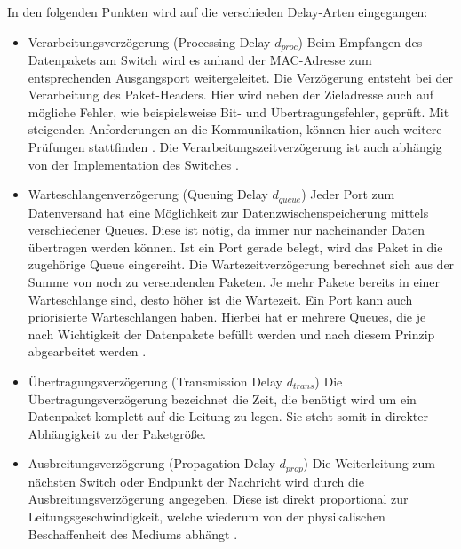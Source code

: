 In den folgenden Punkten wird auf die verschieden Delay-Arten eingegangen:
\begin{itemize}
	\item Verarbeitungsverzögerung (Processing Delay \emph{\(d_{proc}\)})
	\newline Beim Empfangen des Datenpakets am Switch wird es anhand der \ac{MAC}-Adresse zum entsprechenden Ausgangsport weitergeleitet. Die Verzögerung entsteht bei der Verarbeitung des Paket-Headers. Hier wird neben der Zieladresse auch auf mögliche Fehler, wie beispielsweise Bit- und Übertragungsfehler, geprüft. Mit steigenden Anforderungen an die Kommunikation, können hier auch weitere Prüfungen stattfinden \cite{CharacterizingNetwork}. Die Verarbeitungszeitverzögerung ist auch abhängig von der Implementation des Switches \cite{ComputerNetworking}.\newline
	\item Warteschlangenverzögerung (Queuing Delay \emph{\(d_{queue}\)})
	\newline Jeder Port zum Datenversand hat eine Möglichkeit zur Datenzwischenspeicherung mittels verschiedener Queues. Diese ist nötig, da immer nur nacheinander Daten übertragen werden können. Ist ein Port gerade belegt, wird das Paket in die zugehörige Queue eingereiht. Die Wartezeitverzögerung berechnet sich aus der Summe von noch zu versendenden Paketen. Je mehr Pakete bereits in einer Warteschlange sind, desto höher ist die Wartezeit.
	Ein Port kann auch priorisierte Warteschlangen haben. Hierbei hat er mehrere Queues, die je nach Wichtigkeit der Datenpakete befüllt werden und nach diesem Prinzip abgearbeitet werden \cite{ComputerNetworking}.\newline
	\item Übertragungsverzögerung (Transmission Delay \emph{\(d_{trans}\)})
	\newline Die Übertragungsverzögerung  bezeichnet die Zeit, die benötigt wird um ein Datenpaket komplett auf die Leitung zu legen. Sie steht somit in direkter Abhängigkeit zu der Paketgröße. \cite{ComputerNetworking}\newline
	\item Ausbreitungsverzögerung (Propagation Delay \emph{\(d_{prop}\)})
	Die Weiterleitung zum nächsten Switch oder Endpunkt der Nachricht wird durch die Ausbreitungsverzögerung angegeben. Diese ist direkt proportional zur Leitungsgeschwindigkeit, welche wiederum von der physikalischen Beschaffenheit des Mediums abhängt \cite{ComputerNetworking}.
\end{itemize}


